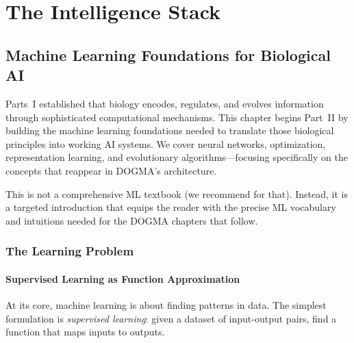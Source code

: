 
\part{The Intelligence Stack}

\chapter{Machine Learning Foundations for Biological AI}
\label{ch:ml-foundations}


\noindent
Parts~I established that biology encodes, regulates, and evolves information through sophisticated computational mechanisms. This chapter begins Part~II by building the machine learning foundations needed to translate those biological principles into working AI systems. We cover neural networks, optimization, representation learning, and evolutionary algorithms---focusing specifically on the concepts that reappear in DOGMA's architecture.

This is not a comprehensive ML textbook (we recommend \citet{goodfellow2016} for that). Instead, it is a targeted introduction that equips the reader with the precise ML vocabulary and intuitions needed for the DOGMA chapters that follow.

\section{The Learning Problem}
\label{sec:learning-problem}

\subsection{Supervised Learning as Function Approximation}

At its core, machine learning is about finding patterns in data. The simplest formulation is \emph{supervised learning}: given a dataset of input-output pairs, find a function that maps inputs to outputs.

